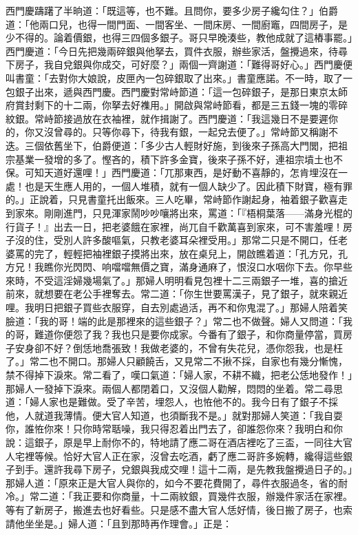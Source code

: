 西門慶躊躇了半晌道：「既這等，也不難。且問你，要多少房子纔勾住？」伯爵道：「他兩口兒，也得一間門面、一間客坐、一間床房、一間廚竈，四間房子，是少不得的。論着價銀，也得三四個多銀子。哥只早晚湊些，教他成就了這樁事罷。」西門慶道：「今日先把幾兩碎銀與他拏去，買件衣服，辦些家活，盤攪過來，待尋下房子，我自兌銀與你成交，可好麼？」兩個一齊謝道：「難得哥好心。」西門慶便叫書童：「去對你大娘說，皮匣內一包碎銀取了出來。」書童應諾。不一時，取了一包銀子出來，遞與西門慶。西門慶對常峙節道：「這一包碎銀子，是那日東京太師府賞封剩下的十二兩，你拏去好襍用。」開啟與常峙節看，都是三五錢一塊的零碎紋銀。常峙節接過放在衣袖裡，就作揖謝了。西門慶道：「我這幾日不是要遲你的，你又沒曾尋的。只等你尋下，待我有銀，一起兌去便了。」常峙節又稱謝不迭。{}三個依舊坐下，伯爵便道：「多少古人輕財好施，到後來子孫高大門閭，把祖宗基業一發增的多了。慳吝的，積下許多金寶，後來子孫不好，連祖宗墳土也不保。可知天道好還哩！」西門慶道：「兀那東西，是好動不喜靜的，怎肯埋沒在一處！也是天生應人用的，一個人堆積，就有一個人缺少了。因此積下財寶，極有罪的。」{}正說着，只見書童托出飯來。三人吃畢，常峙節作謝起身，袖着銀子歡喜走到家來。剛剛進門，只見渾家鬧吵吵嚷將出來，罵道：「『梧桐葉落——滿身光棍的行貨子！』出去一日，把老婆餓在家裡，尚兀自千歡萬喜到家來，可不害羞哩！房子沒的住，受別人許多酸嘔氣，只教老婆耳朵裡受用。」那常二只是不開口，{}任老婆罵的完了，輕輕把袖裡銀子摸將出來，放在桌兒上，開啟瞧着道：「孔方兄，孔方兄！我瞧你光閃閃、响噹噹無價之寶，滿身通麻了，恨沒口水咽你下去。你早些來時，不受這淫婦幾場氣了。」{}那婦人明明看見包裡十二三兩銀子一堆，喜的搶近前來，就想要在老公手裡奪去。{}常二道：「你生世要罵漢子，見了銀子，就來親近哩。我明日把銀子買些衣服穿，自去別處過活，再不和你鬼混了。」那婦人陪着笑臉道：「我的哥！端的此是那裡來的這些銀子？」常二也不做聲。婦人又問道：「我的哥，難道你便怨了我？我也只是要你成家。今番有了銀子，和你商量停當，買房子安身卻不好？倒恁地喬張致！我做老婆的，不曾有失花兒，憑你怨我，也是枉了。」常二也不開口。那婦人只顧饒舌，又見常二不揪不採，自家也有幾分慚愧，禁不得掉下淚來。常二看了，嘆口氣道：「婦人家，不耕不織，把老公恁地發作！」那婦人一發掉下淚來。{}兩個人都閉着口，又沒個人勸解，悶悶的坐着。{}常二尋思道：「婦人家也是難做。受了辛苦，埋怨人，也恠他不的。我今日有了銀子不採他，人就道我薄情。{}便大官人知道，也須斷我不是。」就對那婦人笑道：「我自耍你，誰恠你來！只你時常聒噪，我只得忍着出門去了，卻誰怨你來？我明白和你說：這銀子，原是早上耐你不的，特地請了應二哥在酒店裡吃了三盃，一同往大官人宅裡等候。恰好大官人正在家，沒曾去吃酒，虧了應二哥許多婉轉，纔得這些銀子到手。還許我尋下房子，兌銀與我成交哩！這十二兩，是先教我盤攪過日子的。」那婦人道：「原來正是大官人與你的，如今不要花費開了，尋件衣服過冬，省的耐冷。」常二道：「我正要和你商量，十二兩紋銀，買幾件衣服，辦幾件家活在家裡。等有了新房子，搬進去也好看些。只是感不盡大官人恁好情，{}後日搬了房子，也索請他坐坐是。」婦人道：「且到那時再作理會。」正是：

